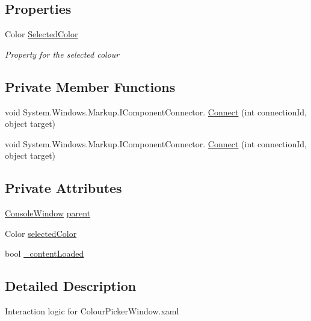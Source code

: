 \subsection*{Properties}
\begin{DoxyCompactItemize}
\item 
Color \hyperlink{class_c_p_u___o_s___simulator_1_1_colour_picker_window_a4e51070f2e58d178bf773acb4200e76e}{Selected\+Color}
\begin{DoxyCompactList}\small\item\em Property for the selected colour \end{DoxyCompactList}\end{DoxyCompactItemize}
\subsection*{Private Member Functions}
\begin{DoxyCompactItemize}
\item 
void System.\+Windows.\+Markup.\+I\+Component\+Connector. \hyperlink{class_c_p_u___o_s___simulator_1_1_colour_picker_window_a857b5ab5ebf06a29846e0595c3c442ad}{Connect} (int connection\+Id, object target)
\item 
void System.\+Windows.\+Markup.\+I\+Component\+Connector. \hyperlink{class_c_p_u___o_s___simulator_1_1_colour_picker_window_a857b5ab5ebf06a29846e0595c3c442ad}{Connect} (int connection\+Id, object target)
\end{DoxyCompactItemize}
\subsection*{Private Attributes}
\begin{DoxyCompactItemize}
\item 
\hyperlink{class_c_p_u___o_s___simulator_1_1_console_window}{Console\+Window} \hyperlink{class_c_p_u___o_s___simulator_1_1_colour_picker_window_a0a40b478316b3e45a63c67347ff9fc63}{parent}
\item 
Color \hyperlink{class_c_p_u___o_s___simulator_1_1_colour_picker_window_a1c1653bebad209bd313da5a18ecea9bc}{selected\+Color}
\item 
bool \hyperlink{class_c_p_u___o_s___simulator_1_1_colour_picker_window_aeb35df31199f12fcf32b741db20a1546}{\+\_\+content\+Loaded}
\end{DoxyCompactItemize}


\subsection{Detailed Description}
Interaction logic for Colour\+Picker\+Window.\+xaml 

